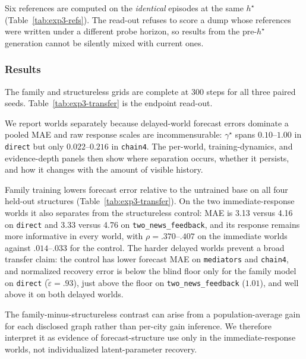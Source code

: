 Six references are computed on the \emph{identical} episodes at the same $h^\star$
(Table~\ref{tab:exp3-refs}). The read-out refuses to score a dump whose references were written under a
different probe horizon, so results from the pre-$h^\star$ generation cannot be silently mixed with
current ones.



\clearpage
\subsubsection{Results}
\label{app:exp3-results}

The family and structureless grids are complete at 300 steps for all three paired
seeds. Table~\ref{tab:exp3-transfer} is the endpoint read-out.

We report worlds separately because delayed-world forecast errors dominate a
pooled MAE and raw response scales are incommensurable: $\gamma^\star$ spans
$0.10$--$1.00$ in \texttt{direct} but only $0.022$--$0.216$ in
\texttt{chain4}. The per-world, training-dynamics, and evidence-depth panels then
show where separation occurs, whether it persists, and how it changes with the
amount of visible history.

Family training lowers forecast error relative to the untrained base on all four
held-out structures (Table~\ref{tab:exp3-transfer}). On the two immediate-response worlds it also separates from
the structureless control: MAE is 3.13 versus 4.16 on \texttt{direct} and 3.33
versus 4.76 on \texttt{two\_news\_feedback}, and its response remains more
informative in every world, with $\rho=.370$--$.407$ on the immediate worlds
against $.014$--$.033$ for the control. The harder delayed worlds prevent a broad
transfer claim: the control has lower forecast MAE on \texttt{mediators} and
\texttt{chain4}, and normalized recovery error is below the blind floor only for
the family model on \texttt{direct} ($\tilde\varepsilon=.93$), just above the floor
on \texttt{two\_news\_feedback} ($1.01$), and well above it on both delayed worlds.

The family-minus-structureless contrast can arise from a population-average gain
for each disclosed graph rather than per-city gain inference. We therefore
interpret it as evidence of forecast-structure use only in the immediate-response
worlds, not individualized latent-parameter recovery.


\begin{center}
\begin{minipage}{\linewidth}
\centering
{}
\label{tab:exp3-transfer}
\scriptsize

\end{minipage}
\end{center}

